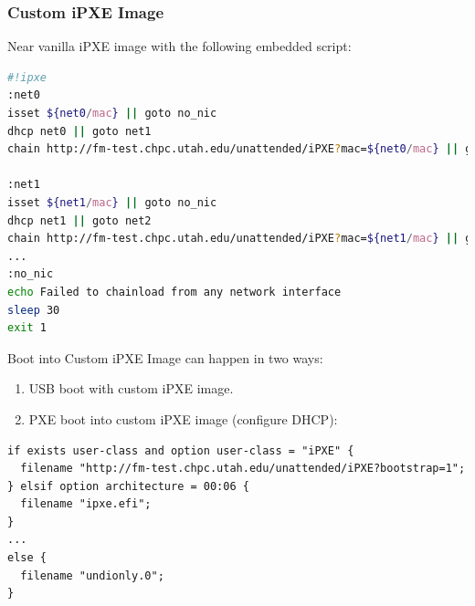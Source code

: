 \documentclass{beamer}
\begin{document}
\begin{frame}[fragile,t]
 \frametitle{Custom iPXE Image}
 \flushleft
 Near vanilla iPXE image with the following embedded script:

 \centering
 \begin{lstlisting}[language=bash,frame=single,basicstyle=\fontsize{3.5}{5pt}\selectfont]
#!ipxe
:net0
isset ${net0/mac} || goto no_nic
dhcp net0 || goto net1
chain http://fm-test.chpc.utah.edu/unattended/iPXE?mac=${net0/mac} || goto net1

:net1
isset ${net1/mac} || goto no_nic
dhcp net1 || goto net2
chain http://fm-test.chpc.utah.edu/unattended/iPXE?mac=${net1/mac} || goto net2
...
:no_nic
echo Failed to chainload from any network interface
sleep 30
exit 1
  \end{lstlisting}
 Boot into Custom iPXE Image can happen in two ways:
 \begin{enumerate}
  \item USB boot with custom iPXE image.
  \item PXE boot into custom iPXE image (configure DHCP):
 \end{enumerate}
 \begin{lstlisting}[frame=single,basicstyle=\fontsize{3.5}{5pt}\selectfont]
if exists user-class and option user-class = "iPXE" {
  filename "http://fm-test.chpc.utah.edu/unattended/iPXE?bootstrap=1";
} elsif option architecture = 00:06 {
  filename "ipxe.efi";
}
...
else {
  filename "undionly.0";
}
  \end{lstlisting}

\end{frame}
\end{document}
